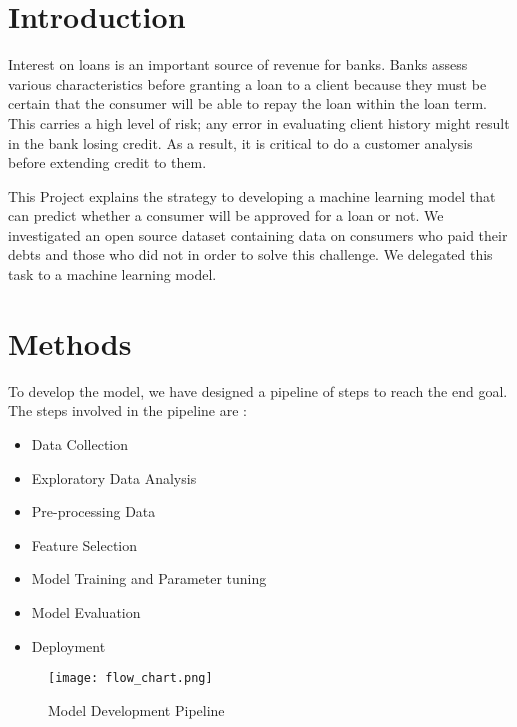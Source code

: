 \documentclass[12pt]{article}
\begin{document}
\section{Introduction} %

Interest on loans is an important source of revenue for banks. Banks assess various characteristics before granting a loan to a client because they must be certain that the consumer will be able to repay the loan within the loan term. This carries a high level of risk; any error in evaluating client history might result in the bank losing credit. As a result, it is critical to do a customer analysis before extending credit to them.

This Project explains the strategy to developing a machine learning model that can predict whether a consumer will be approved for a loan or not. We investigated an open source dataset containing data on consumers who paid their debts and those who did not in order to solve this challenge. We delegated this task to a machine learning model.


\section{Methods}
To develop the model, we have designed a pipeline of steps to reach the end goal. The steps involved in the pipeline are :


\begin{itemize}
  \item Data Collection
  \item Exploratory Data Analysis
  \item Pre-processing Data
  \item Feature Selection
  \item Model Training and Parameter tuning
  \item Model Evaluation
  \item Deployment
 \end{itemize}

\begin{figure}[h] %
\centering
\texttt{[image: flow\_chart.png]}
\caption{Model Development Pipeline}
\end{figure}
\end{document}
